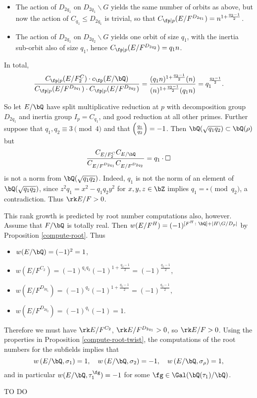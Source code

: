 \begin{example}[Dihedral]
\begin{itemize}[--]
            \item The action of $D_{2 q_1}$ on $D_{2 q_1} \backslash G$ yields the same number of orbits as above, but now the action of $C_{q_1} \leq D_{2 q_1}$ is trivial, so that $C_{\fp \mid p}(E / F^{D_{2 q_1}}) = n^{1 + \frac{q_2 - 1}{2}}$.
            
            \item The action of $D_{2 q_1}$ on $D_{2 q_2} \backslash G$ yields one orbit of size $q_1$, with the inertia sub-orbit also of size $q_1$, hence $C_{\fp \mid p}(E / F^{D_{2 q_2}}) = q_1 n$.
        \end{itemize}
    In total,
    \[ \frac{C_{\fp \mid p}(E / F^C_2) \cdot c_{\fp}(E / \bQ)}{C_{\fp \mid p}(E / F^{D_{2 q_1}})\cdot C_{\fp \mid p}(E / F^{D_{2 q_2}})} = \frac{(q_1 n )^{1 + \frac{q_2 - 1}{2}} (n)}{(n)^{1 + \frac{q_2 - 1}{2}} (q_1 n)} = q_1^{\frac{q_2 - 1}{2}} .\] 

    So let $E / \bQ$ have split multiplicative reduction at $p$ with decomposition group $D_{2 q_1}$ and inertia group $I_p = C_{q_1}$, and good reduction at all other primes. Further suppose that $q_1, q_2 \equiv 3 \pmod 4$ and that $\left( \frac{q_1}{q_2} \right)  = -1$. Then $\bQ(\sqrt{q_1 q_2}) \subset \bQ(\rho)$ but 
$$\frac{C_{E / F^C_2} C_{E / \bQ}}{C_{E / F^{D_{2 q_1}}} C_{E / F^{D_{2 q_2}}}} = q_1 \cdot \square$$
is not a norm from $\bQ(\sqrt{q_1 q_2})$. Indeed, $q_1$ is not the norm of an element of $\bQ(\sqrt{q_1 q_2})$, since $z^2 q_1 = x^2 - q_1q_2 y^2$ for $x,y,z \in \bZ$ implies $q_1 = \square \pmod {q_2}$, a contradiction. Thus $\rk E / F > 0$.

    This rank growth is predicted by root number computations also, however. Assume that $F / \bQ$ is totally real. Then $w(E / F^H) = (-1)^{[F^H \colon \bQ] + | H \backslash G / D_p|}$ by Proposition \ref{compute-root}. Thus
    \begin{itemize}[--]
        \setlength\itemsep{0em}
        \item $w(E / \bQ) = (-1)^2 = 1$,
        \item $w(E / F^{C_2}) = (-1)^{q_1 q_2} (-1)^{1 + \frac{q_2 - 1}{2}} = (-1)^{\frac{q_2 - 1}{2}}$,
        \item $w(E / F^{D_{2 q_1}}) = (-1)^{q_2}(-1)^{1 + \frac{q_2 - 1}{2}} = (-1)^{\frac{q_2 - 1}{2}},$
        \item $w(E / F^{D_{2 q_2}}) = (-1)^{q_1}(-1) = 1$. 
    \end{itemize}
    Therefore we must have $\rk E / F^{C_2}$, $\rk E / F^{D_{2q_1}} > 0$, so $\rk E / F > 0$. 
    Using the properties in Proposition \ref{compute-root-twist}, the computations of the root numbers for the subfields implies that 
    \[ w\left(E / \bQ, \sigma_1\right) = 1, \quad w\left(E / \bQ, \sigma_2\right) = -1, \quad w\left(E / \bQ, \sigma_{\rho}\right) = 1, \]
  and in particular $w(E / \bQ, \tau_1^{\fg}) = -1$ for some $\fg \in \Gal(\bQ(\tau_1) / \bQ)$.
\end{example}

\begin{example}
{\color{red} TO DO}


\end{example}